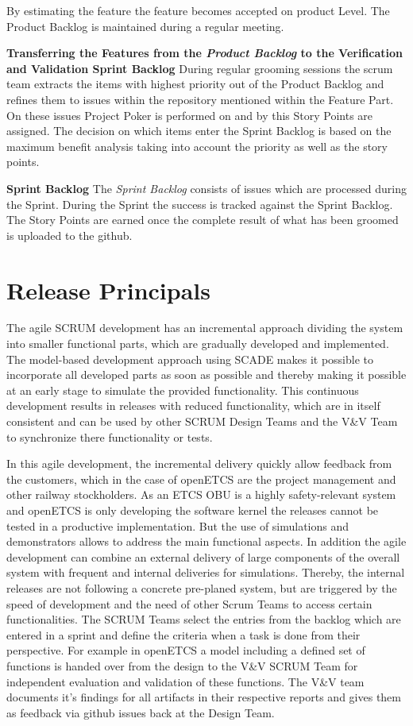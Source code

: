 By estimating the feature the feature becomes accepted on product Level.
The Product Backlog is maintained during a regular meeting.

\textbf{Transferring the Features from the \textit{Product Backlog} to the Verification and Validation Sprint Backlog}
During regular grooming sessions the scrum team extracts the items with highest priority out of the Product Backlog and refines them to issues within the repository mentioned within the Feature Part.
On these issues Project Poker is performed on and by this Story Points are assigned. The decision on which items enter the Sprint Backlog is based on the maximum benefit analysis taking into account the priority as well as the story points.

\textbf{Sprint Backlog}
The \textit{Sprint Backlog} consists of issues which are processed during the Sprint.
During the Sprint the success is tracked against the Sprint Backlog.
The Story Points are earned once the complete result of what has been groomed is uploaded to the github.

\chapter{Release Principals}
\label{sec:Releases}

The agile SCRUM development has an incremental approach dividing the system into smaller functional parts, which are gradually developed and implemented. The model-based development approach using SCADE makes it possible to incorporate all developed parts as soon as possible and thereby making it possible at an early stage to simulate the provided functionality. This continuous development results in releases with reduced functionality, which are in itself consistent and can be used by other SCRUM Design Teams and the V\&V Team to synchronize there functionality or tests.

In this agile development, the incremental delivery quickly allow feedback from the customers, which in the case of openETCS are the project management and other railway stockholders. As an ETCS OBU is a highly safety-relevant system and openETCS is only developing the software kernel the releases cannot be tested in a productive implementation. But the use of simulations and demonstrators allows to address the main functional aspects. In addition the agile development can combine an external delivery of large components of the overall system with frequent and internal deliveries for simulations. Thereby, the internal releases are not following a concrete pre-planed system, but are triggered by the speed of development and the need of other Scrum Teams to access certain functionalities. The SCRUM Teams select the entries from the backlog which are entered in a sprint and define the criteria when a task is done from their perspective. For example in openETCS a model including a defined set of functions is handed over from the design to the V\&V SCRUM Team for independent evaluation and validation of these functions. The V\&V team documents it's findings for all artifacts in their respective reports and gives them as feedback via github issues back at the Design Team.  

